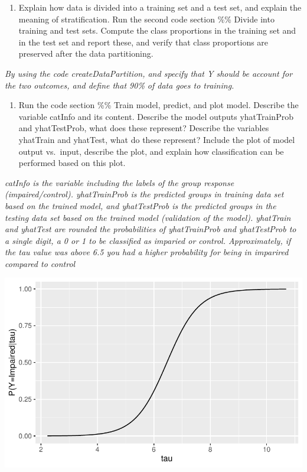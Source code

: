 \documentclass[
  letterpaper,
  DIV=11,
  numbers=noendperiod]{scrartcl}
\providecommand{\tightlist}{%
  \setlength{\itemsep}{0pt}\setlength{\parskip}{0pt}}\usepackage{longtable,booktabs,array}
\begin{document}
\begin{enumerate}
\def\labelenumi{(\alph{enumi})}
\setcounter{enumi}{1}
\tightlist
\item
  Explain how data is divided into a training set and a test set, and
  explain the meaning of stratification. Run the second code section
  \%\% Divide into training and test sets. Compute the class proportions
  in the training set and in the test set and report these, and verify
  that class proportions are preserved after the data partitioning.
\end{enumerate}

\emph{By using the code createDataPartition, and specify that Y should
be account for the two outcomes, and define that 90\% of data goes to
training.}

\begin{enumerate}
\def\labelenumi{(\alph{enumi})}
\setcounter{enumi}{2}
\tightlist
\item
  Run the code section \%\% Train model, predict, and plot model.
  Describe the variable catInfo and its content. Describe the model
  outputs yhatTrainProb and yhatTestProb, what does these represent?
  Describe the variables yhatTrain and yhatTest, what do these
  represent? Include the plot of model output vs.~input, describe the
  plot, and explain how classification can be performed based on this
  plot.
\end{enumerate}

\emph{catInfo is the variable including the labels of the group response
(impaired/control). yhatTrainProb is the predicted groups in training
data set based on the trained model, and yhatTestProb is the predicted
groups in the testing data set based on the trained model (validation of
the model). yhatTrain and yhatTest are rounded the probabilities of
yhatTrainProb and yhatTestProb to a single digit, a 0 or 1 to be
classified as imparied or control. Approximately, if the tau value was
above 6.5 you had a higher probability for being in imparired compared
to control}

\includegraphics{excercise_doc_files/figure-pdf/unnamed-chunk-12-1.pdf}
\end{document}
